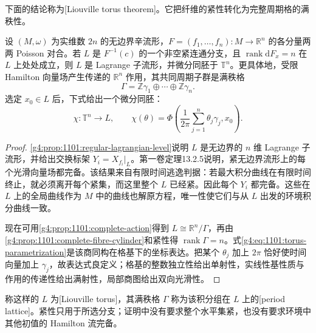 下面的结论称为[Liouville torus theorem]。它把纤维的紧性转化为完整周期格的满秩性。

\begin{theorem}\label{g4:thm:1101:liouville-torus}
	设 \((M,\omega)\) 为实维数 \(2n\) 的无边界辛流形，\(F=(f_1,\ldots,f_n):M\to\mathbb R^n\) 的各分量两两 Poisson 对合。若 \(L\) 是 \(F^{-1}(c)\) 的一个非空紧连通分支，且 \(\operatorname{rank}\mathrm{d}F_x=n\) 在 \(L\) 上处处成立，则 \(L\) 是 Lagrange 子流形，并微分同胚于 \(\mathbb T^n\)。更具体地，受限 Hamilton 向量场产生传递的 \(\mathbb R^n\) 作用，其共同周期子群是满秩格
	\[
		\Gamma=\mathbb Z\gamma_1\oplus\cdots\oplus\mathbb Z\gamma_n.
	\]
	选定 \(x_0\in L\) 后，下式给出一个微分同胚：
	\begin{equation}\label{g4:eq:1101:torus-parametrization}
		\chi:\mathbb T^n\longrightarrow L,
		\qquad
		\chi(\theta)=\Phi\left(\frac1{2\pi}
		\sum_{j=1}^n\theta_j\gamma_j,x_0\right).
	\end{equation}
\end{theorem}
\begin{proof}
	\cref{g4:prop:1101:regular-lagrangian-level}说明 \(L\) 是无边界的 \(n\) 维 Lagrange 子流形，并给出交换标架 \(Y_i=X_{f_i}|_L\)。第一卷定理13.2.5说明，紧无边界流形上的每个光滑向量场都完备。该结果来自有限时间逃逸判据：若最大积分曲线在有限时间终止，就必须离开每个紧集，而这里整个 \(L\) 已经紧。因此每个 \(Y_i\) 都完备。这些在 \(L\) 上的全局曲线作为 \(M\) 中的曲线也解原方程，唯一性使它们与从 \(L\) 出发的环境积分曲线一致。

	现在可用\cref{g4:prop:1101:complete-action}得到 \(L\cong\mathbb R^n/\Gamma\)，再由\cref{g4:prop:1101:complete-fibre-cylinder}和紧性得 \(\operatorname{rank}\Gamma=n\)。式\eqref{g4:eq:1101:torus-parametrization}是该商同构在格基下的坐标表达。把某个 \(\theta_j\) 加上 \(2\pi\) 恰好使时间向量加上 \(\gamma_j\)，故表达式良定义；格基的整数独立性给出单射性，实线性基性质与作用的传递性给出满射性，局部商图给出双向光滑性。\cite[第5.5节，定理5.14(a)，第152页]{Cannas2006Symplectic}
\end{proof}

称这样的 \(L\) 为[Liouville torus]，其满秩格 \(\Gamma\) 称为该积分组在 \(L\) 上的[period lattice]。紧性只用于所选分支；证明中没有要求整个水平集紧，也没有要求环境中其他初值的 Hamilton 流完备。

\ProseParagraphBreak

